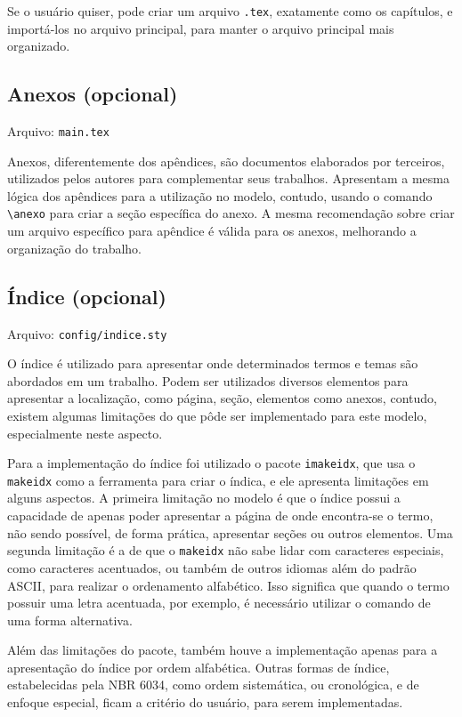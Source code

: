     Se o usuário quiser, pode criar um arquivo \texttt{.tex}, exatamente como os capítulos, e importá-los no arquivo principal, para manter o arquivo principal mais organizado.

\subsection{Anexos (opcional)}
    Arquivo: \texttt{main.tex}
    
    Anexos, diferentemente dos apêndices, são documentos elaborados por terceiros, utilizados pelos autores para complementar seus trabalhos. Apresentam a mesma lógica dos apêndices para a utilização no modelo, contudo, usando o comando \verb|\anexo| para criar a seção específica do anexo. A mesma recomendação sobre criar um arquivo específico para apêndice é válida para os anexos, melhorando a organização do trabalho.

\subsection{Índice (opcional)}
    Arquivo: \texttt{config/indice.sty}

    O índice é utilizado para apresentar onde determinados termos e temas são abordados em um trabalho. Podem ser utilizados diversos elementos para apresentar a localização, como página, seção, elementos como anexos, contudo, existem algumas limitações do que pôde ser implementado para este modelo, especialmente neste aspecto.
    
    Para a implementação do índice foi utilizado o pacote \texttt{imakeidx}, que usa o \texttt{makeidx} como a ferramenta para criar o índica, e ele apresenta limitações em alguns aspectos. A primeira limitação no modelo é que o índice possui a capacidade de apenas poder apresentar a página de onde encontra-se o termo, não sendo possível, de forma prática, apresentar seções ou outros elementos. Uma segunda limitação é a de que o \texttt{makeidx} não sabe lidar com caracteres especiais, como caracteres acentuados, ou também de outros idiomas além do padrão ASCII, para realizar o ordenamento alfabético. Isso significa que quando o termo possuir uma letra acentuada, por exemplo, é necessário utilizar o comando de uma forma alternativa.
    
    Além das limitações do pacote, também houve a implementação apenas para a apresentação do índice por ordem alfabética. Outras formas de índice, estabelecidas pela NBR 6034, como ordem sistemática, ou cronológica, e de enfoque especial, ficam a critério do usuário, para serem implementadas.

